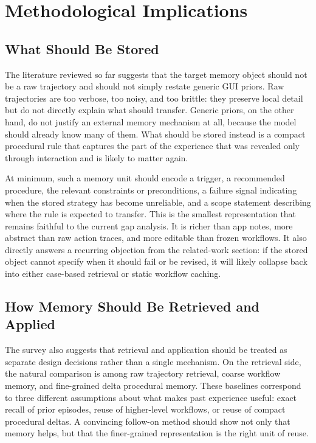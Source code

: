 \documentclass{article}
\begin{document}
\section{Methodological Implications}\label{7-methodological-implications}

\subsection{What Should Be Stored}\label{71-what-should-be-stored}

The literature reviewed so far suggests that the target memory object
should not be a raw trajectory and should not simply restate generic GUI
priors. Raw trajectories are too verbose, too noisy, and too brittle:
they preserve local detail but do not directly explain what should
transfer. Generic priors, on the other hand, do not justify an external
memory mechanism at all, because the model should already know many of
them. What should be stored instead is a compact procedural rule that
captures the part of the experience that was revealed only through
interaction and is likely to matter again.

At minimum, such a memory unit should encode a trigger, a recommended
procedure, the relevant constraints or preconditions, a failure signal
indicating when the stored strategy has become unreliable, and a scope
statement describing where the rule is expected to transfer. This is the
smallest representation that remains faithful to the current gap
analysis. It is richer than app notes, more abstract than raw action
traces, and more editable than frozen workflows. It also directly
answers a recurring objection from the related-work section: if the
stored object cannot specify when it should fail or be revised, it will
likely collapse back into either case-based retrieval or static workflow
caching.

\subsection{How Memory Should Be Retrieved and Applied}\label{72-how-memory-should-be-retrieved-and-applied}

The survey also suggests that retrieval and application should be
treated as separate design decisions rather than a single mechanism. On
the retrieval side, the natural comparison is among raw trajectory
retrieval, coarse workflow memory, and fine-grained delta procedural
memory. These baselines correspond to three different assumptions about
what makes past experience useful: exact recall of prior episodes, reuse
of higher-level workflows, or reuse of compact procedural deltas. A
convincing follow-on method should show not only that memory helps, but
that the finer-grained representation is the right unit of reuse.
\end{document}
